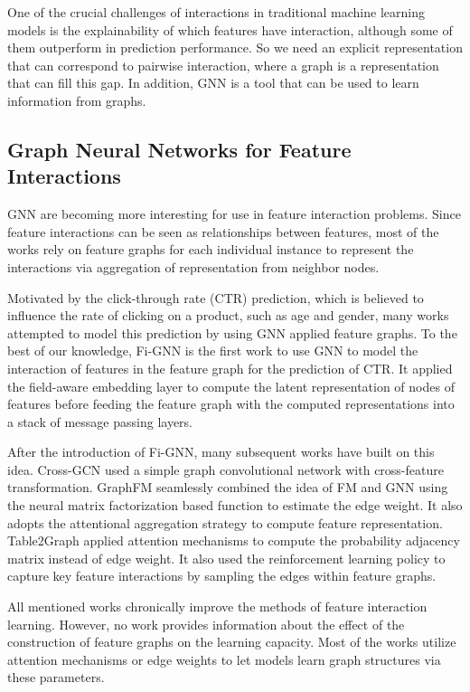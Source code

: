One of the crucial challenges of interactions in traditional machine learning models is the explainability of which features have interaction, although some of them outperform in prediction performance.
So we need an explicit representation that can correspond to pairwise interaction, where a graph is a representation that can fill this gap.
In addition, GNN is a tool that can be used to learn information from graphs.

\subsection{Graph Neural Networks for Feature Interactions}
GNN are becoming more interesting for use in feature interaction problems.
Since feature interactions can be seen as relationships between features, most of the works rely on feature graphs for each individual instance to represent the interactions via aggregation of representation from neighbor nodes.

Motivated by the click-through rate (CTR) prediction, which is believed to influence the rate of clicking on a product, such as age and gender, many works attempted to model this prediction by using GNN applied feature graphs.
To the best of our knowledge, Fi-GNN \cite{fignn} is the first work to use GNN to model the interaction of features in the feature graph for the prediction of CTR.
It applied the field-aware embedding layer to compute the latent representation of nodes of features before feeding the feature graph with the computed representations into a stack of message passing layers.

After the introduction of Fi-GNN, many subsequent works have built on this idea.
Cross-GCN \cite{Feng2020CrossGCNEG} used a simple graph convolutional network with cross-feature transformation.
GraphFM \cite{GraphFM} seamlessly combined the idea of FM and GNN using the neural matrix factorization \cite{NeuralMF} based function to estimate the edge weight. It also adopts the attentional aggregation strategy to compute feature representation.
Table2Graph \cite{Table2Graph} applied attention mechanisms to compute the probability adjacency matrix instead of edge weight. It also used the reinforcement learning policy to capture key feature interactions by sampling the edges within feature graphs.

All mentioned works chronically improve the methods of feature interaction learning.
However, no work provides information about the effect of the construction of feature graphs on the learning capacity.
Most of the works utilize attention mechanisms or edge weights to let models learn graph structures via these parameters.